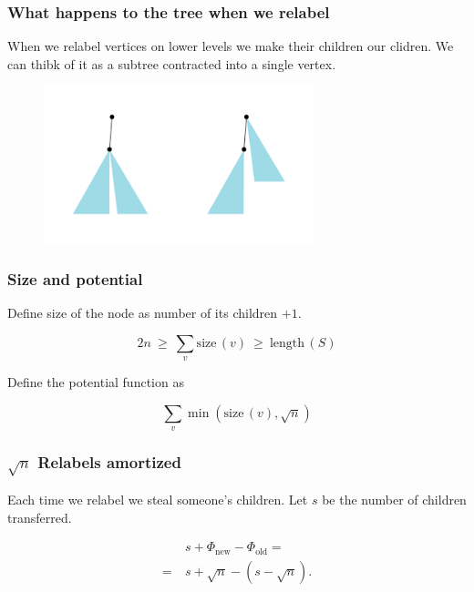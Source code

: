 \documentclass[aspectratio=1610,12pt,notheorems]{beamer}
\begin{document}
\begin{frame} \frametitle{What happens to the tree when we relabel} \vspace{1cm}

	When we relabel vertices on lower levels we make their children our clidren. We can thibk of it as a subtree contracted into a single vertex.

\begin{figure} \centering
	\includegraphics[width=0.7\textwidth]{algolunch/furtpush}
\end{figure}
\end{frame}

\begin{frame} \frametitle{Size and potential}
	Define size of the node as number of its children $+1$.

\begin{block}{\vspace*{-3ex}} \vspace{-1.8ex}
	$$2n\ \ge\ \sum\limits_v \mathrm{size}\, (v)\ \ge\ \mathrm{length}\, (S)$$ \vspace{-1ex}
\end{block}

Define the potential function as
\begin{block}{\vspace*{-3ex}} \vspace{-1.8ex}
	$$\sum\limits_v \min \left( \mathrm{size}\, (v), \sqrt{n} \right)$$ \vspace{-1ex}
\end{block}

\end{frame}

\begin{frame} \frametitle{$\sqrt{n}$ Relabels amortized}
Each time we relabel we steal someone's children. Let $s$ be the number of children transferred.

\begin{align*}
	& s + \Phi_{\text{new}} - \Phi_{\text{old}} = \\
=\ 	& s + \sqrt{n} - (s - \sqrt{n}).
\end{align*}

\end{frame}
\end{document}
